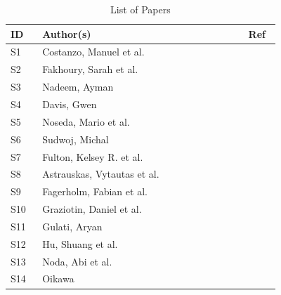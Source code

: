 \documentclass[conference]{IEEEtran}
\begin{document}
\begin{table}[!htbp]
    \caption{List of Papers}
    \label{tab:primary_papers}
    \centering
    \def\arraystretch{1.3}
    \begin{tabular}{p{0.1\linewidth}p{0.65\linewidth}p{0.1\linewidth}}
        \hline
        ID  & Author(s)                            & Ref                                                         \\\hline\hline
        S1  & Costanzo, Manuel et al.              & \cite{costanzoPerformanceVsProgramming2021}                 \\\hline
        S2  & Fakhoury, Sarah et al.               & \cite{fakhouryEffectPoorSource2018}                         \\\hline
        S3  & Nadeem, Ayman                        & \cite{nadeemHumancenteredApproachStaticanalysisdriven2022a} \\\hline
        S4  & Davis, Gwen                          & \cite{davisDeveloperExperienceWhat2023}                     \\\hline
        S5  & Noseda, Mario et al.                 & \cite{nosedaRustSecureIoT2022}                              \\\hline
        S6  & Sudwoj, Michal                       & \cite{sudwojRustProgrammingLanguage2020}                    \\\hline
        S7  & Fulton, Kelsey R. et al.             & \cite{fultonBenefitsDrawbacksAdopting2021}                  \\\hline
        S8  & Astrauskas, Vytautas et al.          & \cite{astrauskasHowProgrammersUse2020}                      \\\hline
        S9  & Fagerholm, Fabian et al.             & \cite{fagerholmDeveloperExperienceConcept2012}              \\\hline
        S10 & Graziotin, Daniel et al.             & \cite{graziotin2015you}                                     \\\hline
        S11 & Gulati, Aryan                        & \cite{gulati2022can}                                        \\\hline
        S12 & Hu, Shuang et al.                    & \cite{huComprehensivenessAutomationLifecycle2022}           \\\hline
        S13 & Noda, Abi et al.                     & \cite{nodaDevExWhatActually2023}                            \\\hline
        S14 & Oikawa                               & \cite{oikawaExperienceDevelopingFAT2023}                    \\\hline

\end{tabular}
\end{table}
\end{document}

